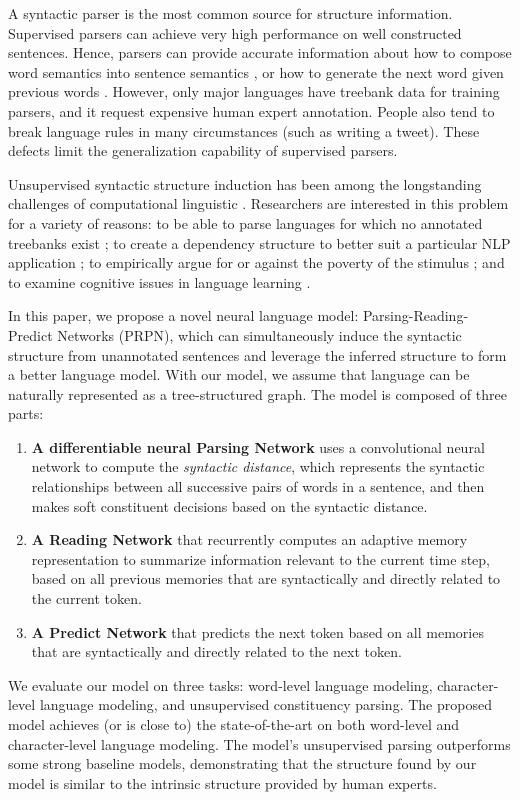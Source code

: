 \documentclass{article} \usepackage{iclr2018_conference,times}
\begin{document}
A syntactic parser is the most common source for structure information. Supervised parsers can achieve very high performance on well constructed sentences. Hence, parsers can provide accurate information about how to compose word semantics into sentence semantics \citep{socher2013recursive}, or how to generate the next word given previous words \citep{wu2017sequence}. However, only major languages have treebank data for training parsers, and it request expensive human expert annotation. People also tend to break language rules in many circumstances (such as writing a tweet). These defects limit the generalization capability of supervised parsers.



Unsupervised syntactic structure induction has been among the longstanding challenges of computational linguistic \citep{klein2002generative, klein2004corpus, bod2006all}. Researchers are interested in this problem for a variety of reasons: to be able to parse languages for which no annotated treebanks exist \citep{marecek2016twelve}; to create a dependency structure to better suit a particular NLP application \citep{wu2017sequence}; to empirically argue for or against the poverty of the stimulus \citep{clark2001unsupervised, chomsky2014aspects}; and to examine cognitive issues in language learning \citep{solan2003automatic}. 



In this paper, we propose a novel neural language model: Parsing-Reading-Predict Networks (PRPN), which can simultaneously induce the syntactic structure from unannotated sentences and leverage the inferred structure to form a better language model.
With our model, we assume that language can be naturally represented as a  tree-structured graph. The model is composed of three parts: 
\begin{enumerate}
\item \textbf{A differentiable neural Parsing Network} uses a convolutional neural network to compute the \emph{syntactic distance}, which represents the syntactic relationships between all successive pairs of words in a sentence, and then makes soft constituent decisions based on the syntactic distance.
\item \textbf{A Reading Network} that recurrently computes an adaptive memory representation to summarize information relevant to the current time step, based on all previous memories that are syntactically and directly related to the current token. 
\item \textbf{A Predict Network} that predicts the next token based on all memories that are syntactically and directly related to the next token. 
\end{enumerate}
We evaluate our model on three tasks: word-level language modeling, character-level language modeling, and unsupervised constituency parsing. The proposed model achieves (or is close to) the state-of-the-art on both word-level and character-level language modeling. The model's unsupervised parsing outperforms some strong baseline models, demonstrating that the structure found by our model is similar to the intrinsic structure provided by human experts. 
\end{document}
